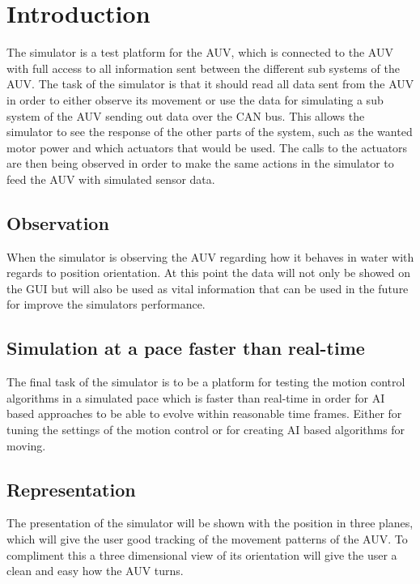 \section{Introduction}\label{sec:introduction}
The simulator is a test platform for the AUV, which is connected to the AUV with full access to all information sent between the different sub systems of the AUV. The task of the simulator is that it should read all data sent from the AUV in order to either observe its movement or use the data for simulating a sub system of the AUV sending out data over the CAN bus. This allows the simulator to see the response of the other parts of the system, such as the wanted motor power and which actuators that would be used. The calls to the actuators are then being observed in order to make the same actions in the simulator to feed the AUV with simulated sensor data.

\subsection{Observation}
When the simulator is observing the AUV regarding how it behaves in water with regards to position orientation. At this point the data will not only be showed on the GUI but will also be used as vital information that can be used in the future for improve the simulators performance.

\subsection{Simulation at a pace faster than real-time}
The final task of the simulator is to be a platform for testing the motion control algorithms in a simulated pace which is faster than real-time in order for AI based approaches to be able to evolve within reasonable time frames. Either for tuning the settings of the motion control or for creating AI based algorithms for moving.

\subsection{Representation}
The presentation of the simulator will be shown with the position in three planes, which will give the user good tracking of the movement patterns of the AUV. To compliment this a three dimensional view of its orientation will give the user a clean and easy how the AUV turns.
